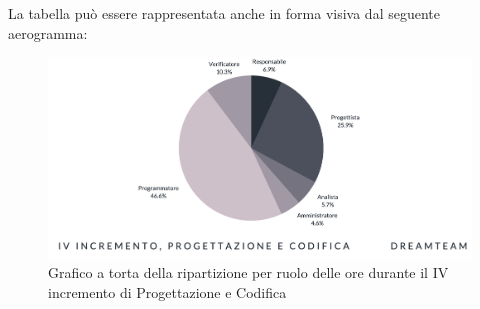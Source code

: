 La tabella può essere rappresentata anche in forma visiva dal seguente aerogramma:
\begin{figure}[H]
\centering
\includegraphics[scale=0.50]{Sezioni/SezioniPreventivo/grafici/progettazione/Progettazione_IV_incremento_costi.png}
\caption{Grafico a torta della ripartizione per ruolo delle ore durante il IV incremento di Progettazione e Codifica}
\end{figure}

\pagebreak

